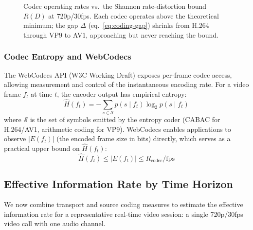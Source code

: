 \begin{figure}[ht]
\caption{Codec operating rates vs.\ the Shannon rate-distortion bound $R(D)$
  at 720p/30fps. Each codec operates above the theoretical minimum; the gap
  $\Delta$ (eq.~\ref{eq:coding-gap}) shrinks from H.264 through VP9 to AV1,
  approaching but never reaching the bound.}
\label{fig:rate-distortion}
\end{figure}

\subsubsection{Codec Entropy and WebCodecs}

The WebCodecs API (W3C Working Draft) exposes per-frame codec access,
allowing measurement and control of the instantaneous encoding rate.
For a video frame $f_t$ at time $t$, the encoder output has empirical
entropy:
\begin{equation}
  \hat{H}(f_t) = -\sum_{s \in \mathcal{S}}
    p(s \mid f_t) \log_2 p(s \mid f_t)
  \label{eq:frame-entropy}
\end{equation}
where $\mathcal{S}$ is the set of symbols emitted by the entropy coder
(CABAC for H.264/AV1, arithmetic coding for VP9). WebCodecs enables
applications to observe $|E(f_t)|$ (the encoded frame size in bits)
directly, which serves as a practical upper bound on
$\hat{H}(f_t)$:
\begin{equation}
  \hat{H}(f_t) \leq |E(f_t)| \leq R_{\text{codec}} / \text{fps}
  \label{eq:entropy-bound}
\end{equation}

\subsection{Effective Information Rate by Time Horizon}

We now combine transport and source coding measures to estimate the
effective information rate for a representative real-time video
session: a single 720p/30fps video call with one audio channel.


